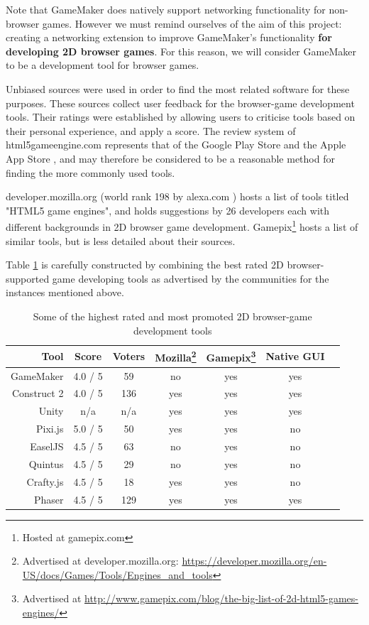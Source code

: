 \documentclass[bsc, 12pt, twoside, singlespacing, parskip, abbrevs, notimes, normalheadings, logo]{styles/infthesis}
\begin{document}
Note that GameMaker does natively support networking functionality for non-browser games. However we must remind ourselves of the aim of this project: creating a networking extension to improve GameMaker's functionality \textbf{for developing 2D browser games}. For this reason, we will consider GameMaker to be a development tool for browser games.

Unbiased sources were used in order to find the most related software for these purposes. These sources collect user feedback for the browser-game development tools. Their ratings were established by allowing users to criticise tools based on their personal experience, and apply a score. The review system of html5gameengine.com \cite{html5_gamedev_tools} represents that of the Google Play Store \cite{Google_Play_Store} and the Apple App Store \cite{Apple_App_Store}, and may therefore be considered to be a reasonable method for finding the more commonly used tools.

developer.mozilla.org \cite{html5_mozilla} (world rank 198 by alexa.com \cite{alexa_ranking}) hosts a list of tools titled "HTML5 game engines", and holds suggestions by 26 developers each with different backgrounds in 2D browser game development. Gamepix\footnote{Hosted at gamepix.com} \cite{gamepix_engines} hosts a list of similar tools, but is less detailed about their sources.

Table \ref{table:Related_Tools} is carefully constructed by combining the best rated 2D browser-supported game developing tools as advertised by the communities for the instances mentioned above.

\begin{savenotes}
\begin{table}[H]
\centering
  \begin{tabular}{ | r || c | c | c | c | c | c | }
  	\hline
  	\textbf{Tool}			& \textbf{Score}		& \textbf{Voters}& \textbf{Mozilla}\footnote{Advertised at developer.mozilla.org: \url{https://developer.mozilla.org/en-US/docs/Games/Tools/Engines\_and\_tools}} 	& \textbf{Gamepix}\footnote{Advertised at \url{http://www.gamepix.com/blog/the-big-list-of-2d-html5-games-engines/}} 	& \textbf{Native GUI}\\ \hline\hline
	GameMaker		& 4.0 / 5	& 59	& no	& yes	& yes	\\ \hline
    Construct 2		& 4.0 / 5	& 136	& yes	& yes	& yes	\\ \hline    
    Unity			& n/a		& n/a	& yes	& yes	& yes	\\ \hline
    Pixi.js			& 5.0 / 5	& 50	& yes	& yes	& no	\\ \hline
    EaselJS			& 4.5 / 5	& 63	& no	& yes	& no	\\ \hline
    Quintus			& 4.5 / 5	& 29	& no	& yes	& no	\\ \hline
    Crafty.js		& 4.5 / 5	& 18	& yes	& yes	& no	\\ \hline
    Phaser			& 4.5 / 5	& 129	& yes	& yes	& yes	\\ \hline
  \end{tabular}
  \caption{Some of the highest rated and most promoted 2D browser-game development tools}
  \label{table:Related_Tools}
\end{table}%
\end{savenotes}
\end{document}
